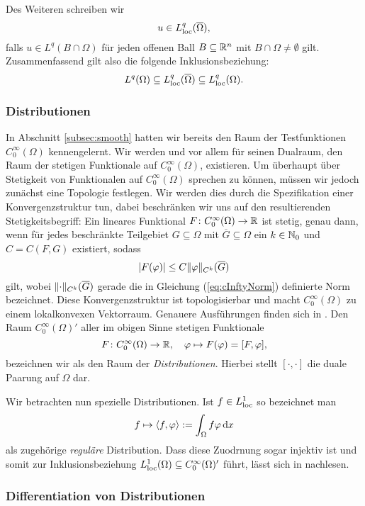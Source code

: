 Des Weiteren schreiben wir
$$
u \in L^q_{\operatorname{loc}}(\overline\Omega),
$$
falls $u \in L^q(B \cap \Omega)$ für jeden offenen Ball $B \subseteq \mathbb{R}^n$ mit $B \cap \Omega \neq \emptyset$ gilt.
Zusammenfassend gilt also die folgende Inklusionsbeziehung:
$$
L^q(\Omega) \subseteq L^q_{\operatorname{loc}}(\overline\Omega) \subseteq L^q_{\operatorname{loc}}(\Omega).
$$

\subsubsection{Distributionen}

In Abschnitt \ref{subsec:smooth} hatten wir bereits den Raum der Testfunktionen $C_0^\infty(\Omega)$ kennengelernt.
Wir werden und vor allem für seinen Dualraum, den Raum der stetigen Funktionale auf $C_0^\infty(\Omega)$, existieren.
Um überhaupt über Stetigkeit von Funktionalen auf $C_0^\infty(\Omega)$ sprechen zu können, müssen wir jedoch zunächst eine Topologie festlegen.
Wir werden dies durch die Spezifikation einer Konvergenzstruktur tun, dabei beschränken wir uns auf den resultierenden Stetigkeitsbegriff:
Ein lineares Funktional $F \colon C_0^\infty(\Omega) \to \mathbb{R}$ ist stetig, genau dann, wenn für jedes beschränkte Teilgebiet $G \subseteq \Omega$ mit $\overline G \subseteq \Omega$ ein $k \in \mathbb{N}_0$ und $C = C(F,G)$ existiert, sodass
$$
|F(\varphi)| \leq C \lVert \varphi \rVert_{C^k}(\overline G)
$$
gilt, wobei $\lVert \cdot \rVert_{C^k}(\overline G)$ gerade die in Gleichung (\ref{eq:cInftyNorm}) definierte Norm bezeichnet.
Diese Konvergenzstruktur ist topologisierbar und macht $C_0^\infty(\Omega)$ zu einem lokalkonvexen Vektorraum.
Genauere Ausführungen finden sich in \cite[S.433f.]{werner2011fa}.
Den Raum $C_0^\infty(\Omega)'$ aller im obigen Sinne stetigen Funktionale
$$
F \colon C_0^\infty(\Omega) \to \mathbb{R}, \quad \varphi \mapsto F(\varphi) = [F, \varphi],
$$
bezeichnen wir als den Raum der \emph{Distributionen}.
Hierbei stellt $[\cdot,\cdot]$ die duale Paarung auf $\Omega$ dar. 

Wir betrachten nun spezielle Distributionen.
Ist $f \in L^1_{\operatorname{loc}}$ so bezeichnet man 
$$
f \mapsto \langle f, \varphi \rangle := \int_\Omega f \varphi \, {\operatorname{d}\!{x}}
$$
als zugehörige \emph{reguläre} Distribution.
Dass diese Zuodrnung sogar injektiv ist und somit zur Inklusionsbeziehung $L^1_{\operatorname{loc}}(\Omega) \subseteq C^\infty_0(\Omega)'$ führt, lässt sich in \cite[S.432, Beispiel (a)]{werner2011fa} nachlesen.

\subsubsection{Differentiation von Distributionen}

